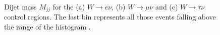 \begin{figure}[!htb]
\centering
{}
 \\
\caption{ Dijet mass $M_{jj}$ for the (a) $W\rightarrow e\nu$, (b) $W\rightarrow\mu\nu$ and (c) $W\rightarrow\tau\nu$ control regions. The last bin represents all those events falling above the range of the histogram \cite{ARTICLE:CMSVBFHiggsInvisibleParkedAnalysisPAS}.}
\label{FIGURE:ParkedDataAnalysis_WBackground_Mjj}
\end{figure}

